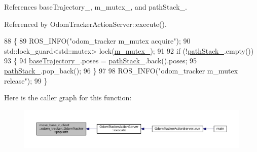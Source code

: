 References base\+Trajectory\+\_\+, m\+\_\+mutex\+\_\+, and path\+Stack\+\_\+.



Referenced by Odom\+Tracker\+Action\+Server\+::execute().


\begin{DoxyCode}
88 \{
89     ROS\_INFO(\textcolor{stringliteral}{"odom\_tracker m\_mutex acquire"});
90     std::lock\_guard<std::mutex> lock(\hyperlink{classmove__base__z__client_1_1odom__tracker_1_1OdomTracker_a63676e03be48b18ac48d5e2f11f19a25}{m\_mutex\_});
91 
92     \textcolor{keywordflow}{if} (!\hyperlink{classmove__base__z__client_1_1odom__tracker_1_1OdomTracker_abb14ccfc0c5273714a5279baa07dfd11}{pathStack\_}.empty())
93     \{
94         \hyperlink{classmove__base__z__client_1_1odom__tracker_1_1OdomTracker_a83fa5a9bfe0b2683eee33444d3f030ea}{baseTrajectory\_}.poses = \hyperlink{classmove__base__z__client_1_1odom__tracker_1_1OdomTracker_abb14ccfc0c5273714a5279baa07dfd11}{pathStack\_}.back().poses;
95         \hyperlink{classmove__base__z__client_1_1odom__tracker_1_1OdomTracker_abb14ccfc0c5273714a5279baa07dfd11}{pathStack\_}.pop\_back();
96     \}
97 
98     ROS\_INFO(\textcolor{stringliteral}{"odom\_tracker m\_mutex release"});
99 \}
\end{DoxyCode}


Here is the caller graph for this function\+:
\nopagebreak
\begin{figure}[H]
\begin{center}
\leavevmode
\includegraphics[width=350pt]{classmove__base__z__client_1_1odom__tracker_1_1OdomTracker_ad7bc705c10a84b14df4e7d937e4e5f7e_icgraph}
\end{center}
\end{figure}


